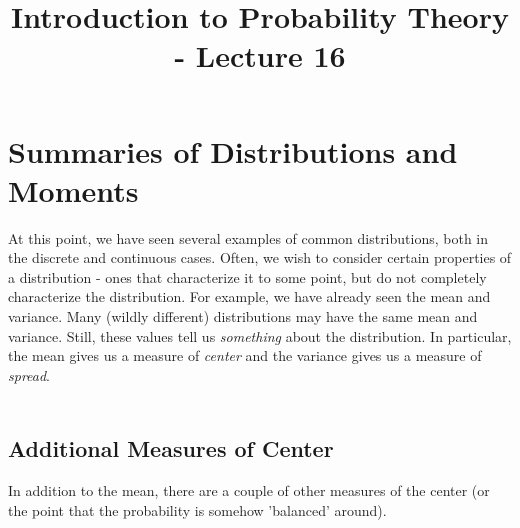 \documentclass[12pt]{article} %
\date{}
\title{Introduction to Probability Theory - Lecture 16}
\begin{document}
\maketitle

\section{Summaries of Distributions and Moments}
At this point, we have seen several examples of common distributions, both in the discrete and continuous cases. Often, we wish to consider certain properties of a distribution - ones that characterize it to some point, but do not completely characterize the distribution. For example, we have already seen the mean and variance. Many (wildly different) distributions may have the same mean and variance. Still, these values tell us \emph{something} about the distribution. In particular, the mean gives us a measure of \emph{center} and the variance gives us a measure of \emph{spread}.\\\\
\subsection{Additional Measures of Center}
In addition to the mean, there are a couple of other measures of the center (or the point that the probability is somehow 'balanced' around). \\
\end{document}
